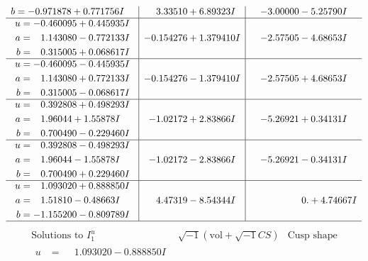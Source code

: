 \documentclass[1p]{elsarticle_modified}
\theoremstyle{definition}
\newcommand{\I}{\sqrt{-1}}
\begin{document}
$$\begin{array}{c|c|c}
\begin{aligned}
b &= -0.971878 + 0.771756 I\end{aligned}
 & \phantom{-}3.33510 + 6.89323 I & -3.00000 - 5.25790 I \\ \hline\begin{aligned}
u &= -0.460095 + 0.445935 I \\
a &= \phantom{-}1.143080 - 0.772133 I \\
b &= \phantom{-}0.315005 + 0.068617 I\end{aligned}
 & -0.154276 + 1.379410 I & -2.57505 - 4.68653 I \\ \hline\begin{aligned}
u &= -0.460095 - 0.445935 I \\
a &= \phantom{-}1.143080 + 0.772133 I \\
b &= \phantom{-}0.315005 - 0.068617 I\end{aligned}
 & -0.154276 - 1.379410 I & -2.57505 + 4.68653 I \\ \hline\begin{aligned}
u &= \phantom{-}0.392808 + 0.498293 I \\
a &= \phantom{-}1.96044 + 1.55878 I \\
b &= \phantom{-}0.700490 - 0.229460 I\end{aligned}
 & -1.02172 + 2.83866 I & -5.26921 + 0.34131 I \\ \hline\begin{aligned}
u &= \phantom{-}0.392808 - 0.498293 I \\
a &= \phantom{-}1.96044 - 1.55878 I \\
b &= \phantom{-}0.700490 + 0.229460 I\end{aligned}
 & -1.02172 - 2.83866 I & -5.26921 - 0.34131 I \\ \hline\begin{aligned}
u &= \phantom{-}1.093020 + 0.888850 I \\
a &= \phantom{-}1.51810 - 0.48663 I \\
b &= -1.155200 - 0.809789 I\end{aligned}
 & \phantom{-}4.47319 - 8.54344 I & \phantom{-0.000000 -}0. + 4.74667 I\\
 \hline 
 \end{array}$$\newpage$$\begin{array}{c|c|c}  
\text{Solutions to }I^u_{1}& \I (\text{vol} + \sqrt{-1}CS) & \text{Cusp shape}\\
 \hline 
\begin{aligned}
u &= \phantom{-}1.093020 - 0.888850 I \\

\end{aligned}
\end{array}$$
\end{document}
